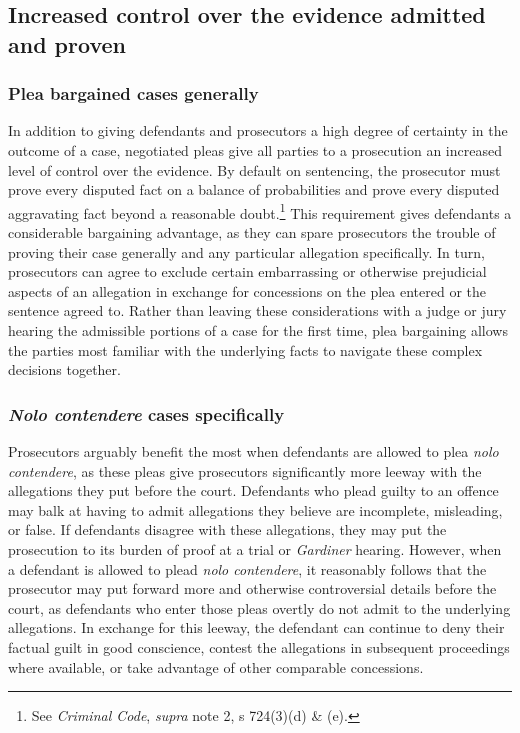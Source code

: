 \subsection{Increased control over the evidence admitted and proven}

\subsubsection{Plea bargained cases generally}

In addition to giving defendants and prosecutors a high degree of certainty in the outcome of a case, negotiated pleas give all parties to a prosecution an increased level of control over the evidence. By default on sentencing, the prosecutor must prove every disputed fact on a balance of probabilities and prove every disputed aggravating fact beyond a reasonable doubt.\footnote{See \textit{Criminal Code}, \textit{supra} note 2, s 724(3)(d) \& (e).} This requirement gives defendants a considerable bargaining advantage, as they can spare prosecutors the trouble of proving their case generally and any particular allegation specifically. In turn, prosecutors can agree to exclude certain embarrassing or otherwise prejudicial aspects of an allegation in exchange for concessions on the plea entered or the sentence agreed to. Rather than leaving these considerations with a judge or jury hearing the admissible portions of a case for the first time, plea bargaining allows the parties most familiar with the underlying facts to navigate these complex decisions together.

\subsubsection{\textit{Nolo contendere} cases specifically}

Prosecutors arguably benefit the most when defendants are allowed to plea \textit{nolo contendere}, as these pleas give prosecutors significantly more leeway with the allegations they put before the court. Defendants who plead guilty to an offence may balk at having to admit allegations they believe are incomplete, misleading, or false. If defendants disagree with these allegations, they may put the prosecution to its burden of proof at a trial or \textit{Gardiner} hearing. However, when a defendant is allowed to plead \textit{nolo contendere}, it reasonably follows that the prosecutor may put forward more and otherwise controversial details before the court, as defendants who enter those pleas overtly do not admit to the underlying allegations. In exchange for this leeway, the defendant can continue to deny their factual guilt in good conscience, contest the allegations in subsequent proceedings where available, or take advantage of other comparable concessions.

